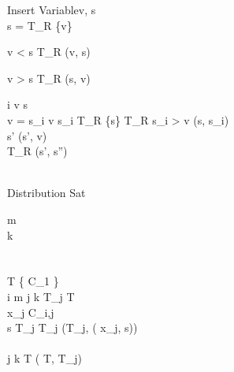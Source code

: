 \begin{pseudocode}{Insert Variable}{v, s}
\\
	\IF s = \emptyset \THEN
		T_R \GETS \{v\}	
		
	\ELSEIF v < s \THEN
		T_R \GETS {}(v, s)
		
	\ELSEIF v > s \THEN
		T_R \GETS {}(s, v)

	\ELSE 
		\BEGIN
			 i  v  s\\
			\IF v = s_i \THEN
				\BEGIN			
				\IF v  s_i  
				T_R \GETS \{s\}
				\ELSE
				T_R \GETS \emptyset
				\ELSEIF s_i > v \THEN
				\BEGIN
					[s', s''] \GETS {}(s, s_i)\\
					s' \GETS {}(s', v)\\
					T_R  \GETS {}(s', s'')\\
				\END
				\END
		\END \\
\end{pseudocode}

\begin{pseudocode}{Distribution Sat}{\phi}

m \\
k \\
\\

\\
T \GETS \{ C_1 \} \\

\FOR i   m \DO
	\BEGIN 
	\FOR j   k \DO
		\BEGIN
			T_j \GETS T\\
			x_j \GETS C_{i,j}\\
			\FOREACH {} s  T_j \DO		
				T_j \GETS {}(T_j, ( x_j, s))\\
		\END\\
	\FOR j   k \DO
		T \GETS {}( T, T_j)\\

	\END
\\
\end{pseudocode}


